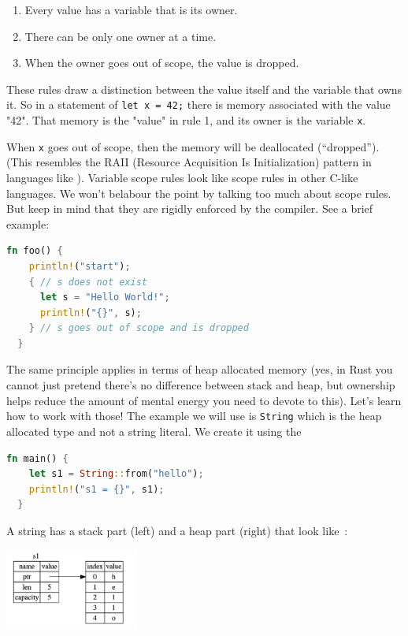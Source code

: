 \begin{enumerate}
	\item Every value has a variable that is its owner.
	\item There can be only one owner at a time.
	\item When the owner goes out of scope, the value is dropped.
\end{enumerate}

These rules draw a distinction between the value itself and the variable that owns it. So in a statement of \texttt{let x = 42;} there is memory associated with the value "42". That memory is the "value" in rule 1, and its owner is the variable \texttt{x}.

When \texttt{x} goes out of scope, then the memory will be deallocated (``dropped''). (This resembles the RAII (Resource Acquisition Is Initialization) pattern in languages like \CPP). Variable scope rules look like scope rules in other C-like languages. We won't belabour the point by talking too much about scope rules. But keep in mind that they are rigidly enforced by the compiler. See a brief example:
\begin{lstlisting}[language=Rust]
  fn foo() {
    println!("start");
    { // s does not exist
      let s = "Hello World!";
      println!("{}", s);
    } // s goes out of scope and is dropped
  }
\end{lstlisting}

The same principle applies in terms of heap allocated memory (yes, in Rust you cannot just pretend there's no difference between stack and heap, but ownership helps reduce the amount of mental energy you need to devote to this). Let's learn how to work with those! The example we will use is \texttt{String} which is the heap allocated type and not a string literal. We create it using the 
\begin{lstlisting}[language=Rust]
  fn main() {
    let s1 = String::from("hello");
    println!("s1 = {}", s1);
  }
\end{lstlisting}

A string has a stack part (left) and a heap part (right) that look like~\cite{rustdocs}:
\begin{center}
\includegraphics[width=0.33\textwidth]{images/string.png} 
\end{center}


